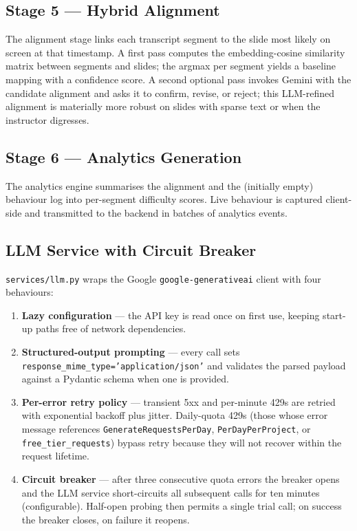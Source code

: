 \documentclass[conference]{IEEEtran}
\begin{document}
\subsection{Stage 5 --- Hybrid Alignment}

The alignment stage links each transcript segment to the slide most likely on screen at that timestamp. A first pass computes the embedding-cosine similarity matrix between segments and slides; the argmax per segment yields a baseline mapping with a confidence score. A second optional pass invokes Gemini with the candidate alignment and asks it to confirm, revise, or reject; this LLM-refined alignment is materially more robust on slides with sparse text or when the instructor digresses.

\subsection{Stage 6 --- Analytics Generation}

The analytics engine summarises the alignment and the (initially empty) behaviour log into per-segment difficulty scores. Live behaviour is captured client-side and transmitted to the backend in batches of analytics events.

\subsection{LLM Service with Circuit Breaker}

\texttt{services/llm.py} wraps the Google \texttt{google-generativeai} client with four behaviours:

\begin{enumerate}
    \item \textbf{Lazy configuration} --- the API key is read once on first use, keeping start-up paths free of network dependencies.
    \item \textbf{Structured-output prompting} --- every call sets \texttt{response\_mime\_type='application/json'} and validates the parsed payload against a Pydantic schema when one is provided.
    \item \textbf{Per-error retry policy} --- transient 5xx and per-minute 429s are retried with exponential backoff plus jitter. Daily-quota 429s (those whose error message references \texttt{GenerateRequestsPerDay}, \texttt{PerDayPerProject}, or \texttt{free\_tier\_requests}) bypass retry because they will not recover within the request lifetime.
    \item \textbf{Circuit breaker} --- after three consecutive quota errors the breaker opens and the LLM service short-circuits all subsequent calls for ten minutes (configurable). Half-open probing then permits a single trial call; on success the breaker closes, on failure it reopens.
\end{enumerate}
\end{document}

